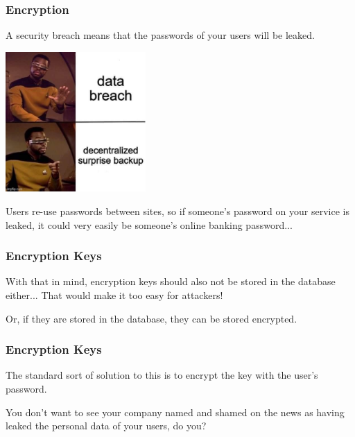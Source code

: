 \begin{frame}
\frametitle{Encryption}

A security breach means that the passwords of your users will be leaked.

\begin{center}
	\includegraphics[width=0.4\textwidth]{images/dataleak.jpg}
\end{center}

Users re-use passwords between sites, so if someone's password on your service is leaked, it could very easily be someone's online banking password...


\end{frame}



\begin{frame}
\frametitle{Encryption Keys}
With that in mind, encryption keys should also not be stored in the database either... That would make it too easy for attackers! 

Or, if they are stored in the database, they can be stored encrypted. 


\end{frame}



\begin{frame}
\frametitle{Encryption Keys}

The standard sort of solution to this is to encrypt the key with the user's password. 

You don't want to see your company named and shamed on the news as having leaked the personal data of your users, do you?


\end{frame}




